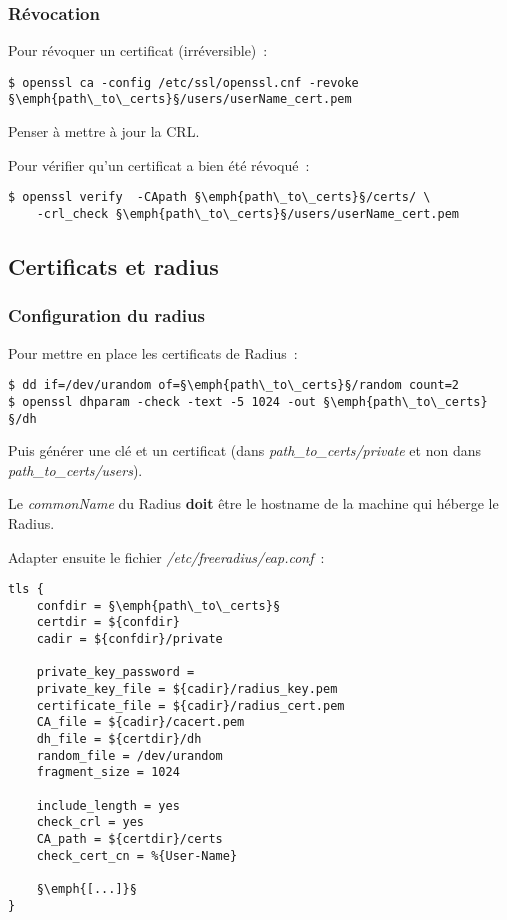 \subsubsection{Révocation}

Pour révoquer un certificat (irréversible)~: 

\begin{lstlisting}
$ openssl ca -config /etc/ssl/openssl.cnf -revoke §\emph{path\_to\_certs}§/users/userName_cert.pem
\end{lstlisting}

Penser à mettre à jour la CRL.

Pour vérifier qu'un certificat a bien été révoqué~:

\begin{lstlisting}
$ openssl verify  -CApath §\emph{path\_to\_certs}§/certs/ \
    -crl_check §\emph{path\_to\_certs}§/users/userName_cert.pem
\end{lstlisting}

\subsection{Certificats et radius}
\subsubsection{Configuration du radius}

Pour mettre en place les certificats de Radius~: 

\begin{lstlisting}
$ dd if=/dev/urandom of=§\emph{path\_to\_certs}§/random count=2
$ openssl dhparam -check -text -5 1024 -out §\emph{path\_to\_certs}§/dh
\end{lstlisting}

Puis générer une clé et un certificat (dans \emph{path\_to\_certs/private} et non dans \emph{path\_to\_certs/users}).

Le \emph{commonName} du Radius \textbf{doit} être le hostname de la machine qui héberge le Radius.

Adapter ensuite le fichier \emph{/etc/freeradius/eap.conf}~:

\begin{lstlisting}
tls {
	confdir = §\emph{path\_to\_certs}§ 
	certdir = ${confdir}
	cadir = ${confdir}/private

	private_key_password =
	private_key_file = ${cadir}/radius_key.pem
	certificate_file = ${cadir}/radius_cert.pem
	CA_file = ${cadir}/cacert.pem
	dh_file = ${certdir}/dh
	random_file = /dev/urandom
	fragment_size = 1024

	include_length = yes
	check_crl = yes
	CA_path = ${certdir}/certs
	check_cert_cn = %{User-Name}

	§\emph{[...]}§
}
\end{lstlisting}

